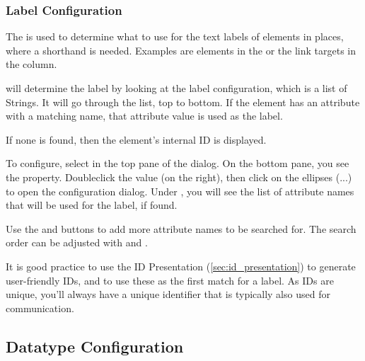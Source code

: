 \subsubsection{Label Configuration}

The  is used to determine what to use for the text labels of elements
in places, where a shorthand is needed.  Examples are elements in the  or the link targets in the  column.

\pror{} will determine the label by looking at the label configuration, which is a list of Strings.
It will go through the list, top to bottom.  If the element has an attribute with a matching name,
that attribute value is used as the label.

If none is found, then the element's internal ID is displayed.

To configure, select  in the top pane of the dialog.  On the bottom pane, you see the  property.  Doubleclick the value (on the right), then click on the ellipses (...) to open the configuration dialog.  Under , you will see the list of attribute names that will be used for the label, if found.

Use the  and  buttons to add more attribute names to be searched for.  The
search order can be adjusted with  and .

\begin{info}
It is good practice to use the ID Presentation (\ref{sec:id_presentation}) to generate
user-friendly IDs, and to use these as the first match for a label.  As IDs are unique, you'll always
have a unique identifier that is typically also used for communication.
\end{info}

\subsection{Datatype Configuration}
\label{sec:datatype_configuration}

